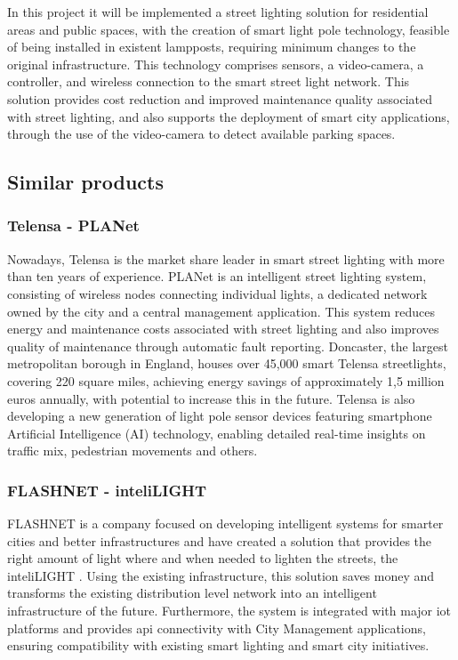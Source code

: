 In this project it will be implemented a street lighting solution for residential areas and public spaces, with the creation of smart light pole technology, feasible of being installed in existent lampposts, requiring minimum changes to the original infrastructure. This technology comprises sensors, a video-camera, a controller, and wireless connection to the smart street light network. This solution provides cost reduction and improved maintenance quality associated with street lighting, and also supports the deployment of smart city applications, through the use of the video-camera to detect available parking spaces.

\subsection{Similar products}

\subsubsection{Telensa - PLANet}

Nowadays, Telensa is the market share leader in smart street lighting with more than ten years of experience.\cite{telensa} PLANet is an intelligent street lighting system, consisting of wireless nodes connecting individual lights, a dedicated network owned by the city and a central management application. This system reduces energy and maintenance costs associated with street lighting and also improves quality of maintenance through automatic fault reporting. Doncaster, the largest metropolitan borough in England, houses over 45,000 smart Telensa streetlights, covering 220 square miles, achieving energy savings of approximately 1,5 million euros annually, with potential to increase this in the future. Telensa is also developing a new generation of light pole sensor devices featuring smartphone Artificial Intelligence (AI) technology, enabling detailed real-time insights on traffic mix, pedestrian movements and others.

\subsubsection{FLASHNET - inteliLIGHT}
FLASHNET is a company focused on developing intelligent systems for smarter cities and better infrastructures and have created a solution that provides the right amount of light where and when needed to lighten the streets, the inteliLIGHT \cite{inteli_light}. Using the existing infrastructure, this solution saves money and transforms the existing distribution level network into an intelligent infrastructure of the future. Furthermore, the system is integrated with major \ac{iot} platforms and provides \ac{api} connectivity with City Management applications, ensuring compatibility with existing smart lighting and smart city initiatives.

